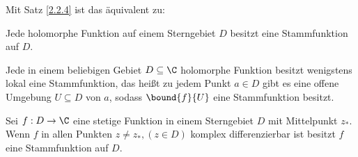		Mit Satz \ref{2.2.4} ist das äquivalent zu:
		
		\begin{thmn}\label{2.2.8}
			Jede holomorphe Funktion auf einem Sterngebiet $D$ besitzt eine Stammfunktion auf $D$.
		\end{thmn}
		
		\begin{cor}
			Jede in einem beliebigen Gebiet $ D \subseteq \C $ holomorphe Funktion besitzt wenigstens lokal eine Stammfunktion, das heißt zu jedem Punkt $ a \in D $ gibt es eine offene Umgebung $ U \subseteq D $ von $a$, sodass $ \bound{f}{U} $ eine Stammfunktion besitzt.
		\end{cor}
		\begin{thm}
			Sei $ f: D \to \C $ eine stetige Funktion in einem Sterngebiet $D$ mit Mittelpunkt $ z_* $. Wenn $f$ in allen Punkten $ z \neq z_*, (z \in D) $ komplex differenzierbar ist besitzt $f$ eine Stammfunktion auf $D$.
		\end{thm}
